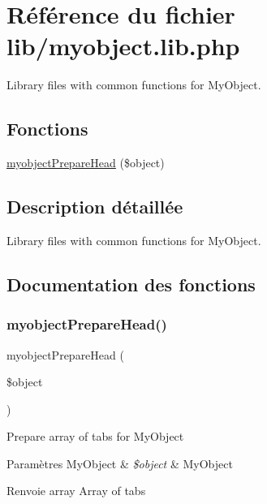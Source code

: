 \hypertarget{myobject_8lib_8php}{}\section{Référence du fichier lib/myobject.lib.\+php}
\label{myobject_8lib_8php}


Library files with common functions for My\+Object.  


\subsection*{Fonctions}
\begin{DoxyCompactItemize}
\item 
\hyperlink{myobject_8lib_8php_abbf0497bb89ef73004eca5403dd6c1bd}{myobject\+Prepare\+Head} (\$object)
\end{DoxyCompactItemize}


\subsection{Description détaillée}
Library files with common functions for My\+Object. 



\subsection{Documentation des fonctions}
\mbox{\label{myobject_8lib_8php_abbf0497bb89ef73004eca5403dd6c1bd}} 
\subsubsection{\texorpdfstring{myobject\+Prepare\+Head()}{myobjectPrepareHead()}}
{\footnotesize\ttfamily myobject\+Prepare\+Head (\begin{DoxyParamCaption}\item[{}]{\$object }\end{DoxyParamCaption})}

Prepare array of tabs for My\+Object


\begin{DoxyParams}[1]{Paramètres}
My\+Object & {\em \$object} & My\+Object \\
\hline
\end{DoxyParams}
\begin{DoxyReturn}{Renvoie}
array Array of tabs 
\end{DoxyReturn}
